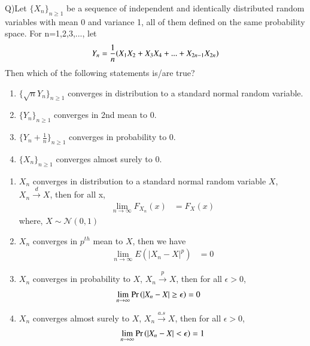 \documentclass[journal,12pt,Twocolumn]{IEEEtran}
\theoremstyle{remark}
\begin{document}

Q)Let $\{X_n\}_{n \geq 1}$ be a sequence of independent and identically distributed random variables with mean 0 and variance 1, all of them defined on the same
probability space. For n=1,2,3,..., let
\begin{align}
Y_n=\frac{1}{n}{\left(X_1X_2+X_3X_4+...+X_{2n-1}X_{2n}\right)} 
\end{align}
Then which of the following statements is/are true? 
\begin{enumerate}[label=(\Alph*)]
\item $\{\sqrt{n}Y_n\}_{n \geq 1}$ converges in distribution to a standard normal random variable.
\item $\{Y_n\}_{n \geq 1}$ converges in 2nd mean to 0.
\item $\{Y_n+\frac{1}{n}\}_{n \geq 1}$ converges in probability to 0.
\item $\{X_n\}_{n \geq 1}$ converges almost surely to 0.
\end{enumerate}
\fi
\solution
\begin{enumerate}
\item $X_n$ converges in distribution to a standard normal random variable $X$, $X_n \xrightarrow{d} X$, then for all x,
\begin{align}
\lim_{n \to \infty} F_{X_n}(x) &= F_X(x)
\end{align}
where, $X \sim \mathcal{N}(0,1)$
\item $X_n$ converges in $p^{th}$ mean to $X$, then we have
\begin{align}
\lim_{n \to \infty} E(|X_n-X|^p)&=0
\end{align}
\item $X_n$ converges in probability to $X$, $X_n \xrightarrow{p} X$, then for all $\epsilon > 0$,
\begin{align}
\lim_{n \to \infty} \Pr\left(|X_n-X|\geq \epsilon\right)&=0
\end{align}
\item $X_n$ converges almost surely to $X$, $X_n \xrightarrow{a.s} X$, then for all $\epsilon > 0$,
\begin{align}
\lim_{n \to \infty} \Pr\left(|X_n - X| <  \epsilon\right) = 1 
\end{align}
\end{enumerate}
\end{document}
